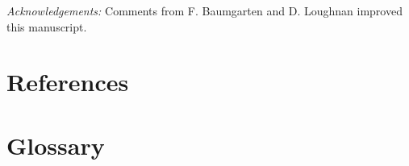 \documentclass[11pt]{article}
\begin{document}
{\emph{Acknowledgements:} Comments from F. Baumgarten and D. Loughnan improved this manuscript. 

\newpage
\section{References}
\vspace{-5ex}


\clearpage

\section{Glossary}


}
\end{document}
